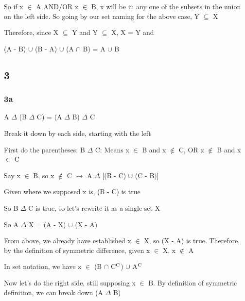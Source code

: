 \documentclass{article}
\begin{document}
\noindent So if x $\in$ A AND/OR x $\in$ B, x will be in any one of the subsets in the union on the left side.  So going by our set naming for the above case, Y $\subseteq$ X \vspace{0.5cm}

\noindent Therefore, since X $\subseteq$ Y and Y $\subseteq$ X, X = Y and \par
\noindent (A - B) $\cup$ (B - A) $\cup$ (A $\cap$ B) = A $\cup$ B

\subsection{3}

\subsubsection{3a}

A $\Delta$ (B $\Delta$ C) = (A $\Delta$ B) $\Delta$ C \vspace{0.5cm}

\noindent Break it down by each side, starting with the left \vspace{0.5cm}

\noindent First do the parentheses: B $\Delta$ C: Means x $\in$ B and x $\not\in$ C, OR x $\not\in$ B and x $\in$ C  \vspace{0.5cm}

\noindent Say x $\in$ B, so x $\not\in$ C $\rightarrow$ A $\Delta$ [(B - C) $\cup$ (C - B)] \par
\noindent Given where we supposed x is, (B - C) is true \vspace{0.5cm}

\noindent So B $\Delta$ C is true, so let's rewrite it as a single set X \vspace{0.5cm}

\noindent So A $\Delta$ X = (A - X) $\cup$ (X - A) \vspace{0.5cm}

\noindent From above, we already have established x $\in$ X, so (X - A) is true.  Therefore, by the definition of symmetric difference, given x $\in$ X, x $\not\in$ A \vspace{0.5cm}

\noindent In set notation, we have x $\in$ (B $\cap$ C$\textsuperscript{C}$) $\cup$ A$\textsuperscript{C}$ \vspace{0.5cm}

\noindent Now let's do the right side, still supposing x $\in$ B.  By definition of symmetric definition, we can break down (A $\Delta$ B) \vspace{0.5cm}
\end{document}
